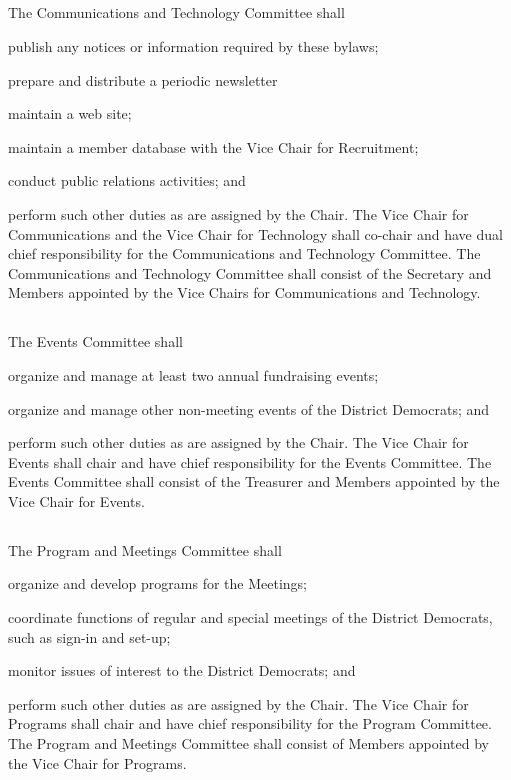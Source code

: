 \subsection{} \label{comms-tech-committee}
The Communications and Technology Committee shall
\begin{inlinealphalist}
    \item publish any notices or information required by these bylaws;
    \item prepare and distribute a periodic newsletter
    \item maintain a web site;
    \item maintain a member database with the Vice Chair for Recruitment;
    \item conduct public relations activities; and
    \item perform such other duties as are assigned by the Chair. The Vice Chair for Communications and the Vice Chair for Technology shall co-chair and have dual chief responsibility for the Communications and Technology Committee. The Communications and Technology Committee shall consist of the Secretary and Members appointed by the Vice Chairs for Communications and Technology.
\end{inlinealphalist}

\subsection{} \label{events-committee}
The Events Committee shall
\begin{inlinealphalist}
    \item organize and manage at least two annual fundraising events;
    \item organize and manage other non-meeting events of the \fortythird{} District Democrats; and
    \item perform such other duties as are assigned by the Chair. The Vice Chair for Events shall chair and have chief responsibility for the Events Committee. The Events Committee shall consist of the Treasurer and Members appointed by the Vice Chair for Events.
\end{inlinealphalist}

\subsection{} \label{meetings-committee}
The Program and Meetings Committee shall
\begin{inlinealphalist}
    \item organize and develop programs for the Meetings;
    \item coordinate functions of regular and special meetings of the \fortythird{} District Democrats, such as sign-in and set-up;
    \item monitor issues of interest to the \fortythird{} District Democrats; and
    \item perform such other duties as are assigned by the Chair. The Vice Chair for Programs shall chair and have chief responsibility for the Program Committee. The Program and Meetings Committee shall consist of Members appointed by the Vice Chair for Programs.
\end{inlinealphalist}

